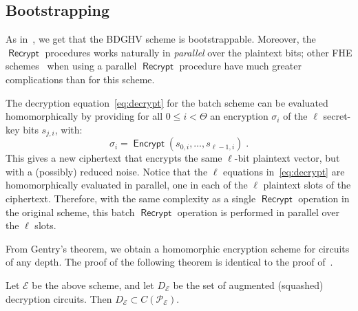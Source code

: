 \documentclass[11pt]{llncs}
\renewcommand\leq\leqslant
\DeclareMathOperator{\Encrypt}{\ensuremath{\mathsf{Encrypt}}}
\DeclareMathOperator{\Recrypt}{\ensuremath{\mathsf{Recrypt}}}
\newcommand\ignore[1]{}
\begin{document}
\subsection{Bootstrapping}\label{subsec:bootstrapping}

As in~\cite{vDGHV2010}, we get that the BDGHV scheme is
bootstrappable. Moreover, the $\Recrypt$ procedures works naturally in \emph{parallel} over the plaintext bits; other FHE schemes~\cite{SV2011,GHS2012a} when using
a parallel $\Recrypt$ procedure have much greater complications than for this
scheme.

\ignore{
In the original DGHV scheme, the decryption equation
was:
\begin{equation}
\label{eq:msz}
m \leftarrow\left[\left\lfloor\sum_{i=0}^{\Theta-1}
s_{i} \cdot z_{i}\right\rceil\right]_2 \oplus
(c \bmod 2) 
\end{equation}
and could be homomorphically evaluated by providing an
encryption $\sigma_i$ of every secret-key bit $s_i$; one would obtain a new
ciphertext which would encrypt the same plaintext bit $m$ but with a
possibly reduced noise.

Similarly, t}
The decryption equation~\eqref{eq:decrypt} for the batch
scheme can be evaluated homomorphically by providing   for
all $0 \leq i < \Theta$ an encryption $\sigma_i$ of the $\ell$
secret-key bits $s_{j,i}$, with:
\[ {\sigma}_i = \Encrypt(s_{0,i}, \ldots, s_{\ell-1,i})\;. \]
This gives a new
ciphertext that encrypts the same $\ell$-bit plaintext vector,
but with a (possibly) reduced noise.  \ignore{In other words, instead of having an
homomorphic evaluation of a single 
equation~\eqref{eq:msz}, we have} Notice that the $\ell$ equations 
in~\eqref{eq:decrypt} are homomorphically evaluated in parallel, one in
each of the $\ell$ 
 plaintext slots of the ciphertext. Therefore, with the same complexity as a single $\Recrypt$
operation in the original scheme, this batch $\Recrypt$
operation is performed in parallel over the 
$\ell$ slots.

From Gentry's theorem, we obtain a homomorphic encryption scheme for
circuits of any depth. The proof of the following theorem is identical
to the proof of~\cite[Theorem~5.1]{CMNT2011}.

\begin{theorem}Let $\mathcal E$ be the above scheme, and let
  $D_{\mathcal E}$ be the set of augmented (squashed) decryption
  circuits. Then $D_{\mathcal E}\subset C(\mathcal{P_E})$. 
\end{theorem}
\end{document}

